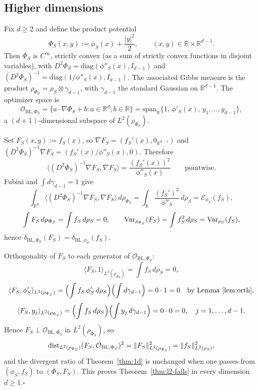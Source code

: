 \subsection*{Higher dimensions}

Fix $d\ge 2$ and define the product potential
\[
  \Phi_S(x,y):=\phi_S(x)+\frac{|y|^2}{2},
  \qquad (x,y)\in\mathbb R\times\mathbb R^{d-1}.
\]
Then $\Phi_S$ is $C^\infty$, strictly convex (as a sum of strictly convex
functions in disjoint variables), with
$D^2\Phi_S=\mathrm{diag}(\phi''_S(x),I_{d-1})$ and
$(D^2\Phi_S)^{-1}=\mathrm{diag}(1/\phi''_S(x),I_{d-1})$. The associated Gibbs
measure is the product
$\rho_{\Phi_S}=\rho_S\otimes\gamma_{d-1}$, with $\gamma_{d-1}$ the standard
Gaussian on $\mathbb R^{d-1}$. The optimizer space is
\[
  \mathcal O_{\mathrm{BL},\Phi_S}
  =\bigl\{a\cdot\nabla\Phi_S+b: a\in\mathbb R^d,b\in\mathbb R\bigr\}
  =\mathrm{span}_{\mathbb R}\bigl\{1,\,\phi'_S(x),\,y_1,\dots,y_{d-1}\bigr\},
\]
a $(d+1)$-dimensional subspace of $L^2(\rho_{\Phi_S})$.

Set $F_S(x,y):=f_S(x)$, so $\nabla F_S=(f_S'(x),0_{\mathbb R^{d-1}})$ and
$(D^2\Phi_S)^{-1}\nabla F_S=(f_S'(x)/\phi''_S(x),0)$. Therefore
\[
  \bigl\langle (D^2\Phi_S)^{-1}\nabla F_S,\nabla F_S\bigr\rangle
  =\frac{(f_S'(x))^2}{\phi''_S(x)}
  \qquad\text{pointwise}.
\]
Fubini and $\int d\gamma_{d-1}=1$ give
\[
  \int_{\mathbb R^d}\bigl\langle (D^2\Phi_S)^{-1}\nabla F_S,\nabla F_S\bigr\rangle
   \,d\rho_{\Phi_S}
  =\int_{\mathbb R}\frac{(f_S')^2}{\phi''_S}\,d\rho_S
  =\mathcal E_{\phi_S}(f_S),
\]
\[
  \int F_S\,d\rho_{\Phi_S}=\int f_S\,d\rho_S=0,\qquad
  \operatorname{Var}_{\rho_{\Phi_S}}(F_S)=\int f_S^2\,d\rho_S=\operatorname{Var}_{\rho_S}(f_S),
\]
hence
$\delta_{\mathrm{BL},\Phi_S}(F_S)=\delta_{\mathrm{BL},\phi_S}(f_S)$.

Orthogonality of $F_S$ to each generator of $\mathcal O_{\mathrm{BL},\Phi_S}$:
\[
  \langle F_S,1\rangle_{L^2(\rho_{\Phi_S})}=\int f_S\,d\rho_S=0,
\]
\[
  \langle F_S,\phi'_S\rangle_{L^2(\rho_{\Phi_S})}
  =\Bigl(\int f_S\,\phi'_S\,d\rho_S\Bigr)\Bigl(\int d\gamma_{d-1}\Bigr)
  =0\cdot 1=0
  \quad\text{by Lemma~\ref{lem:orth}},
\]
\[
  \langle F_S,y_j\rangle_{L^2(\rho_{\Phi_S})}
  =\Bigl(\int f_S\,d\rho_S\Bigr)\Bigl(\int y_j\,d\gamma_{d-1}\Bigr)
  =0\cdot 0=0,
  \quad j=1,\dots,d-1.
\]
Hence $F_S\perp\mathcal O_{\mathrm{BL},\Phi_S}$ in $L^2(\rho_{\Phi_S})$, so
\[
  \operatorname{dist}_{L^2(\rho_{\Phi_S})}(F_S,\mathcal O_{\mathrm{BL},\Phi_S})^2
  =\|F_S\|_{L^2(\rho_{\Phi_S})}^2
  =\|f_S\|_{L^2(\rho_S)}^2,
\]
and the divergent ratio of Theorem~\ref{thm:1d} is unchanged when one passes
from $(\phi_S,f_S)$ to $(\Phi_S,F_S)$. This proves
Theorem~\ref{thm:l2-fails} in every dimension $d\ge 1$.\hfill$\square$
